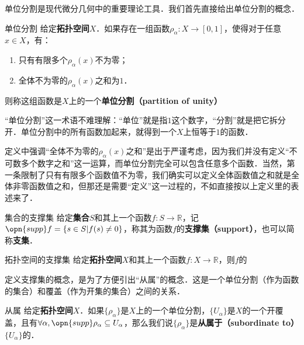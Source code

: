 

单位分割是现代微分几何中的重要理论工具．我们首先直接给出单位分割的概念．

\begin{definition}{单位分割}
给定\textbf{拓扑空间}$X$．如果存在一组函数$\rho_\alpha: X \to [0, 1]$，使得对于任意$x\in X$，有：
\begin{enumerate}
\item 只有有限多个$\rho_\alpha(x)$不为零；
\item 全体不为零的$\rho_\alpha(x)$之和为$1$．
\end{enumerate}
则称这组函数是$X$上的一个\textbf{单位分割（partition of unity）}
\end{definition}

“单位分割”这一术语不难理解：“单位”就是指$1$这个数字，“分割”就是把它拆分开．单位分割中的所有函数加起来，就得到一个$X$上恒等于$1$的函数．

定义中强调“全体不为零的$\rho_\alpha(x)$之和”是出于严谨考虑，因为我们并没有定义“不可数多个数字之和”这一运算，而单位分割完全可以包含任意多个函数．当然，第一条限制了只有有限多个函数值不为零，我们确实可以定义全体函数值之和就是全体非零函数值之和，但那还是需要“定义”这一过程的，不如直接按以上定义里的表述来了．

\begin{definition}{集合的支撑集}
给定\textbf{集合}$S$和其上一个函数$f:S\to\mathbb{R}$，记$\opn{supp} f = \{s\in S| f(s)\not=0\}$，称其为函数$f$的\textbf{支撑集（support）}，也可以简称\textbf{支集}．
\end{definition}

\begin{definition}{拓扑空间的支撑集}
给定\textbf{拓扑空间}$X$和其上一个函数$f:X\to\mathbb{R}$，则$f$的\text
\end{definition}

定义支撑集的概念，是为了方便引出“从属”的概念．这是一个单位分割（作为函数的集合）和覆盖（作为开集的集合）之间的关系．

\begin{definition}{从属}
给定\textbf{拓扑空间}$X$．如果$\{\rho_\alpha\}$是$X$上的一个单位分割，$\{U_\alpha\}$是$X$的一个开覆盖，且有$\forall \alpha, \opn{supp}\rho_\alpha\subseteq U_\alpha$，那么我们说$\{\rho_\alpha\}$是\textbf{从属于（subordinate to）}$\{U_\alpha\}$的．
\end{definition}





